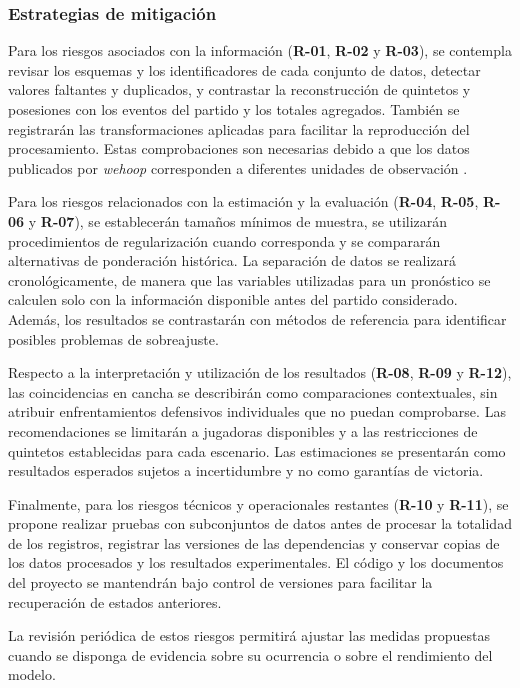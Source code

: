 \subsubsection*{Estrategias de mitigación}

Para los riesgos asociados con la información (\textbf{R-01}, \textbf{R-02} y \textbf{R-03}), se contempla revisar los esquemas y los identificadores de cada conjunto de datos, detectar valores faltantes y duplicados, y contrastar la reconstrucción de quintetos y posesiones con los eventos del partido y los totales agregados. También se registrarán las transformaciones aplicadas para facilitar la reproducción del procesamiento. Estas comprobaciones son necesarias debido a que los datos publicados por \textit{wehoop} corresponden a diferentes unidades de observación \cite{wehoopRepositorio,wehoopPbp,wehoopLineups}.

Para los riesgos relacionados con la estimación y la evaluación (\textbf{R-04}, \textbf{R-05}, \textbf{R-06} y \textbf{R-07}), se establecerán tamaños mínimos de muestra, se utilizarán procedimientos de regularización cuando corresponda y se compararán alternativas de ponderación histórica. La separación de datos se realizará cronológicamente, de manera que las variables utilizadas para un pronóstico se calculen solo con la información disponible antes del partido considerado. Además, los resultados se contrastarán con métodos de referencia para identificar posibles problemas de sobreajuste.

Respecto a la interpretación y utilización de los resultados (\textbf{R-08}, \textbf{R-09} y \textbf{R-12}), las coincidencias en cancha se describirán como comparaciones contextuales, sin atribuir enfrentamientos defensivos individuales que no puedan comprobarse. Las recomendaciones se limitarán a jugadoras disponibles y a las restricciones de quintetos establecidas para cada escenario. Las estimaciones se presentarán como resultados esperados sujetos a incertidumbre y no como garantías de victoria.

Finalmente, para los riesgos técnicos y operacionales restantes (\textbf{R-10} y \textbf{R-11}), se propone realizar pruebas con subconjuntos de datos antes de procesar la totalidad de los registros, registrar las versiones de las dependencias y conservar copias de los datos procesados y los resultados experimentales. El código y los documentos del proyecto se mantendrán bajo control de versiones para facilitar la recuperación de estados anteriores.

La revisión periódica de estos riesgos permitirá ajustar las medidas propuestas cuando se disponga de evidencia sobre su ocurrencia o sobre el rendimiento del modelo.